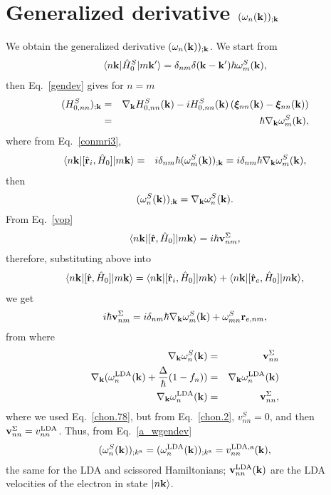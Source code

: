 \section{Generalized derivative \texorpdfstring{$(\omega_n(\mathbf{k}))_{;\mathbf{k}}$}{(wn);k}}\label{gwk}

We obtain the
generalized derivative $(\omega_n(\mathbf{k}))_{;\mathbf{k}}$.
We start from
\begin{eqnarray}\label{a_conH0}
\langle n\mathbf{k} |\hat{H}^S_0| m\mathbf{k}' \rangle=\delta_{nm}\delta(\mathbf{k}-\mathbf{k}')\hbar\omega^S_m(\mathbf{k})
,
\end{eqnarray}
then Eq.~\eqref{gendev} gives for $n=m$
\begin{eqnarray}\label{a_genderH0}
(H^S_{0,nn})_{;\mathbf{k}}&=&
\nabla_{\mathbf{k}}
H^S_{0,n n}(\mathbf{k})
-
i
H^S_{0,nn}(\mathbf{k})
\left(
\boldsymbol{\xi}_{nn}(\mathbf{k})
-
\boldsymbol{\xi}_{nn}(\mathbf{k})
\right)
\nonumber\\
&=&
\hbar\nabla_{\mathbf{k}}\omega^S_m(\mathbf{k})
,
\end{eqnarray}
where from Eq.~\eqref{conmri3}, 
\begin{eqnarray}\label{a_rih0}
\langle n\mathbf{k} |[\hat{\mathbf{r}}_i,\hat{H}_0]| m\mathbf{k} \rangle&=&
i\delta_{nm}\hbar(\omega^S_m(\mathbf{k}))_{;\mathbf{k}}
=
i\delta_{nm}\hbar\nabla_{\mathbf{k}}\omega^S_m(\mathbf{k})
,
\end{eqnarray}
then
\begin{eqnarray}\label{a_wgendev}
(\omega^S_n(\mathbf{k}))_{;\mathbf{k}}=
\nabla_{\mathbf{k}}\omega^S_n(\mathbf{k})
.
\end{eqnarray}
From Eq.~\eqref{vop} 
\begin{eqnarray}\label{a_hr}
\langle n\mathbf{k} |[\hat{\mathbf{r}},\hat{H}_0]| m\mathbf{k} \rangle=
i\hbar\mathbf{v}^\Sigma_{nm}
,
\end{eqnarray}
therefore, substituting above into
\begin{eqnarray}\label{a_hrt}
\langle n\mathbf{k} |[\hat{\mathbf{r}},\hat{H}_0]| m\mathbf{k} \rangle=
\langle n\mathbf{k} |[\hat{\mathbf{r}}_i,\hat{H}_0]| m\mathbf{k} \rangle
+
\langle n\mathbf{k} |[\hat{\mathbf{r}}_e,\hat{H}_0]| m\mathbf{k} \rangle
,
\end{eqnarray}
we get
\begin{eqnarray}\label{a_hrt2}
i\hbar\mathbf{v}^\Sigma_{nm}=
i\delta_{nm}\hbar\nabla_{\mathbf{k}}\omega^S_m(\mathbf{k})
+
\omega^S_{mn}\mathbf{r}_{e,nm}
,
\end{eqnarray}
from where
\begin{eqnarray}\label{a_gradw}
\nabla_{\mathbf{k}}\omega^S_n(\mathbf{k})
&=&
\mathbf{v}^\Sigma_{nn}
\nonumber\\
\nabla_{\mathbf{k}}(\omega^{\mathrm{LDA}}_n(\mathbf{k})+\frac{\Delta}{\hbar}(1-f_n))
&=&
\nabla_{\mathbf{k}}\omega^{\mathrm{LDA}}_n(\mathbf{k})
\nonumber\\
\nabla_{\mathbf{k}}\omega^{\mathrm{LDA}}_n(\mathbf{k})
&=&
\mathbf{v}^\Sigma_{nn}
,
\end{eqnarray}
where we used Eq.~\eqref{chon.78},
but from 
Eq.~\eqref{chon.2}, $v^S_{nn}=0$, and then
$\mathbf{v}^\Sigma_{nn}=v^{\mathrm{LDA}}_{nn}$.
Thus,  from Eq.~\eqref{a_wgendev}
\begin{eqnarray}\label{a_gradw2}
(\omega^S_n(\mathbf{k}))_{;k^{\mathrm{a}}}=
(\omega^{\mathrm{LDA}}_n(\mathbf{k}))_{;k^{\mathrm{a}}}=
v^{\mathrm{LDA},\mathrm{a}}_{nn}(\mathbf{k})
,
\end{eqnarray}
the same for the LDA and scissored Hamiltonians; $\mathbf{v}_{nn}^{\mathrm{LDA}}(\mathbf{k})$ are
the LDA velocities of the electron in state $| n\mathbf{k} \rangle$.
